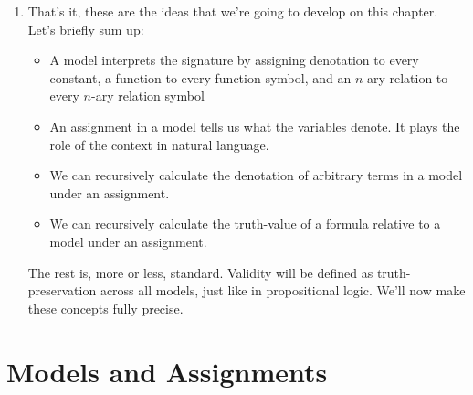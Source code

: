 \begin{enumerate}[\thesection.1]
	\item That's it, these are the ideas that we're going to develop on this chapter. Let's briefly sum up:
	
	\begin{itemize}
	
		\item A model interprets the signature by assigning denotation to every constant, a function to every function symbol, and an $n$-ary relation to every $n$-ary relation symbol
		
		\item An assignment in a model tells us what the variables denote. It plays the role of the context in natural language. 
	
		\item We can recursively calculate the denotation of arbitrary terms in a model under an assignment.
		
		\item We can recursively calculate the truth-value of a formula relative to a model under an assignment.
	
	\end{itemize}
	
	The rest is, more or less, standard. Validity will be defined as truth-preservation across all models, just like in propositional logic. We'll now make these concepts fully precise.
	
	\end{enumerate}
	
\section{Models and Assignments}

